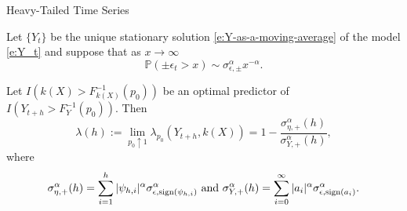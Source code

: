 \documentclass{beamer}
\newtheorem{remark}{Remark}[section]
\def\P{\mathbb P}
\def\sign{{\rm sign}}
\begin{document}
\begin{frame}{Heavy-Tailed Time Series}
    \begin{theorem}\label{thm:AR(p)-extreme-precision}
        Let $\{Y_t\}$ be the unique stationary solution \eqref{e:Y-as-a-moving-average} of the model \eqref{e:Y_t} and suppose that as $x \to \infty$
        \[
        \P(\pm \epsilon_t > x) \sim \sigma_{\epsilon, \pm}^\alpha x^{-\alpha}.
        \]
        
        Let $I(k(X) > F_{k(X)}^{-1}(p_0))$ be an optimal predictor of $I(Y_{t + h} > F_Y^{-1}(p_0))$. Then
        \[
        \lambda(h):= \lim_{p_0 \uparrow 1} \lambda_{p_0}(Y_{t+h}, k(X)) = 1 - \frac{\sigma_{\eta, +}^{\alpha}(h)}{\sigma_{Y, +}^{\alpha}(h)},
        \]
        where
        \[
        \sigma_{\eta, +}^{\alpha}(h) = \sum_{i = 1}^h |\psi_{h, i}|^{\alpha}\sigma_{\epsilon, \sign(\psi_{h, i})}^{\alpha} \text{ and } \sigma_{Y, +}^{\alpha}(h) = \sum_{i = 0}^{\infty} |a_i|^{\alpha}\sigma_{\epsilon, \sign(a_i)}^{\alpha}.
        \]
    \end{theorem}
\end{frame}


\end{document}
